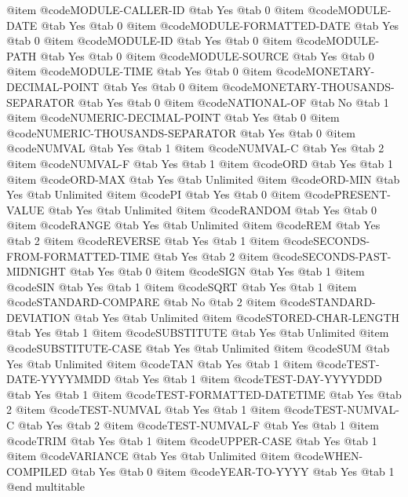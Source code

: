 @item @code{MODULE-CALLER-ID}
@tab Yes @tab 0
@item @code{MODULE-DATE}
@tab Yes @tab 0
@item @code{MODULE-FORMATTED-DATE}
@tab Yes @tab 0
@item @code{MODULE-ID}
@tab Yes @tab 0
@item @code{MODULE-PATH}
@tab Yes @tab 0
@item @code{MODULE-SOURCE}
@tab Yes @tab 0
@item @code{MODULE-TIME}
@tab Yes @tab 0
@item @code{MONETARY-DECIMAL-POINT}
@tab Yes @tab 0
@item @code{MONETARY-THOUSANDS-SEPARATOR}
@tab Yes @tab 0
@item @code{NATIONAL-OF}
@tab No @tab 1
@item @code{NUMERIC-DECIMAL-POINT}
@tab Yes @tab 0
@item @code{NUMERIC-THOUSANDS-SEPARATOR}
@tab Yes @tab 0
@item @code{NUMVAL}
@tab Yes @tab 1
@item @code{NUMVAL-C}
@tab Yes @tab 2
@item @code{NUMVAL-F}
@tab Yes @tab 1
@item @code{ORD}
@tab Yes @tab 1
@item @code{ORD-MAX}
@tab Yes @tab Unlimited
@item @code{ORD-MIN}
@tab Yes @tab Unlimited
@item @code{PI}
@tab Yes @tab 0
@item @code{PRESENT-VALUE}
@tab Yes @tab Unlimited
@item @code{RANDOM}
@tab Yes @tab 0
@item @code{RANGE}
@tab Yes @tab Unlimited
@item @code{REM}
@tab Yes @tab 2
@item @code{REVERSE}
@tab Yes @tab 1
@item @code{SECONDS-FROM-FORMATTED-TIME}
@tab Yes @tab 2
@item @code{SECONDS-PAST-MIDNIGHT}
@tab Yes @tab 0
@item @code{SIGN}
@tab Yes @tab 1
@item @code{SIN}
@tab Yes @tab 1
@item @code{SQRT}
@tab Yes @tab 1
@item @code{STANDARD-COMPARE}
@tab No @tab 2
@item @code{STANDARD-DEVIATION}
@tab Yes @tab Unlimited
@item @code{STORED-CHAR-LENGTH}
@tab Yes @tab 1
@item @code{SUBSTITUTE}
@tab Yes @tab Unlimited
@item @code{SUBSTITUTE-CASE}
@tab Yes @tab Unlimited
@item @code{SUM}
@tab Yes @tab Unlimited
@item @code{TAN}
@tab Yes @tab 1
@item @code{TEST-DATE-YYYYMMDD}
@tab Yes @tab 1
@item @code{TEST-DAY-YYYYDDD}
@tab Yes @tab 1
@item @code{TEST-FORMATTED-DATETIME}
@tab Yes @tab 2
@item @code{TEST-NUMVAL}
@tab Yes @tab 1
@item @code{TEST-NUMVAL-C}
@tab Yes @tab 2
@item @code{TEST-NUMVAL-F}
@tab Yes @tab 1
@item @code{TRIM}
@tab Yes @tab 1
@item @code{UPPER-CASE}
@tab Yes @tab 1
@item @code{VARIANCE}
@tab Yes @tab Unlimited
@item @code{WHEN-COMPILED}
@tab Yes @tab 0
@item @code{YEAR-TO-YYYY}
@tab Yes @tab 1
@end multitable
